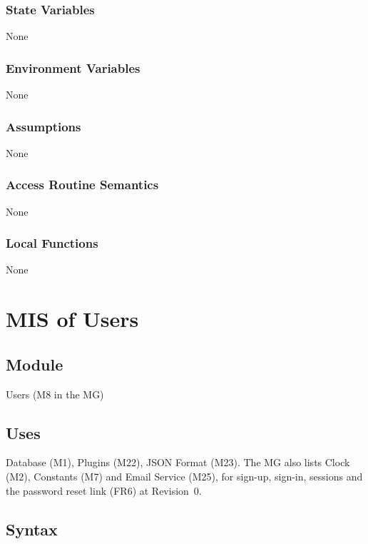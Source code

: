 \documentclass[12pt, titlepage]{article}
\begin{document}
\subsubsection{State Variables}

None

\subsubsection{Environment Variables}

None

\subsubsection{Assumptions}

None

\subsubsection{Access Routine Semantics}

None

\subsubsection{Local Functions}

None

\newpage

\section{MIS of Users} \label{MisUsers}

\subsection{Module}

Users (M8 in the MG)

\subsection{Uses}

Database (M1), Plugins (M22), JSON Format (M23). The MG also lists Clock (M2),
Constants (M7) and Email Service (M25), for sign-up, sign-in, sessions and the
password reset link (FR6) at Revision~0.

\subsection{Syntax}
\end{document}

